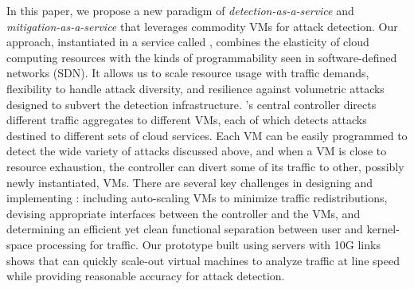 In this paper, we propose a new paradigm of  
{\em detection-as-a-service} and {\em mitigation-as-a-service}
that leverages commodity VMs for attack detection. 
Our approach, instantiated in a service called \nimbus, combines the
elasticity of cloud computing resources 
with the kinds of programmability seen in software-defined networks
(SDN).
%
It allows us to scale resource usage with traffic demands, flexibility
to handle attack diversity, and resilience against volumetric attacks
designed to subvert the detection infrastructure.
%
\nimbus's central controller directs different traffic aggregates to
different VMs, each of which detects attacks destined to different
sets of cloud services.
%
Each VM can be easily programmed to detect the wide variety of attacks
discussed above, and when a VM is close to resource exhaustion, the
controller can divert some of its traffic to other, possibly newly
instantiated, VMs.
%
There are several key challenges in designing and implementing
\nimbus: including auto-scaling VMs to minimize traffic
redistributions, devising appropriate interfaces between the
controller and the VMs, and determining an efficient yet clean
functional separation between user and kernel-space processing for
traffic.
%
Our prototype built using servers with 10G links shows that \nimbus
can quickly scale-out virtual machines to analyze traffic at line
speed while providing reasonable accuracy for attack detection.




